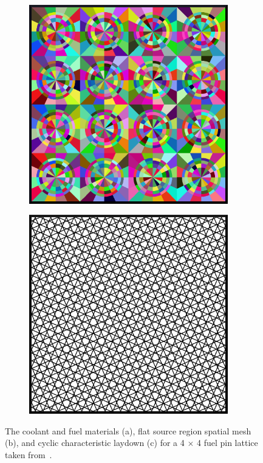 \begin{figure}[h!]
\begin{subfigure}[htb!]{0.32\textwidth}
    \includegraphics[width=0.95\textwidth]{figures/workflow/openmoc/FSRs}
    \label{fig:moc-model-fsrs}
    \caption{}
  \end{subfigure}
  \begin{subfigure}[htb!]{0.32\textwidth}
    \centering
    \includegraphics[width=0.95\textwidth]{figures/workflow/openmoc/cyclic-tracks}
    \label{fig:moc-model-tracks}
    \caption{}
  \end{subfigure}
\caption[Example OpenMOC flat source region mesh and track laydown]{The coolant and fuel materials (a), flat source region spatial mesh (b), and cyclic characteristic laydown (c) for a 4 $\times$ 4 fuel pin lattice taken from~\cite{boyd2016parallel}.}
\label{fig:moc-model}
\end{figure}

